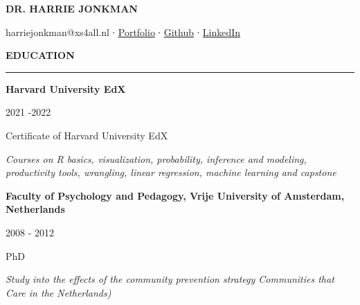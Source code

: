 \documentclass[
  16,
]{article}
\author{}
\date{}
\begin{document}
\ifdefined\Shaded\renewenvironment{Shaded}{\begin{tcolorbox}[frame hidden, borderline west={3pt}{0pt}{shadecolor}, interior hidden, enhanced, boxrule=0pt, sharp corners, breakable]}{\end{tcolorbox}}\fi

\begin{huge}\begin{center}{\bf DR. HARRIE JONKMAN}\end{center}\end{huge}

\begin{center}harriejonkman@xs4all.nl ∙ \href{https://cvharrie.netlify.app/}{Portfolio} ∙ \href{https://github.com/Jonkman1}{Github} ∙ \href{https://www.linkedin.com/in/harrie-jonkman-5224091a/}{LinkedIn}
\end{center}
\vspace{15pt}

\begin{large}
  {\bf EDUCATION}
  \vspace{3pt}
  \hrule
  \begin{multicols}{2}
    \begin{flushleft}{\bf Harvard University EdX}\end{flushleft}
    \begin{flushright}2021 -2022\end{flushright}
  \end{multicols}
  \vspace{-0.17cm}
  \begin{multicols}{2}
    \begin{flushleft}Certificate of Harvard University EdX \end{flushleft}
  \end{multicols}
  \vspace{-0.25cm}
  \textit{Courses on R basics, visualization, probability, inference  and modeling, productivity tools, wrangling, linear regression, machine learning and capstone}
\end{large}

\vspace{0.2cm}

\begin{large}
  \begin{multicols}{2}
    \begin{flushleft}{\bf Faculty of Psychology and Pedagogy, Vrije University of Amsterdam, Netherlands}\end{flushleft}
    \begin{flushright}2008 - 2012\end{flushright}
  \end{multicols}
  \vspace{-0.17cm}
  \begin{multicols}{2}
    \begin{flushleft}PhD\end{flushleft}
  \end{multicols}
  \vspace{-0.25cm}
  \textit{Study into the effects of the community prevention strategy Communities  that Care in the Netherlands)}
\end{large}
\vspace{3pt}
\end{document}
